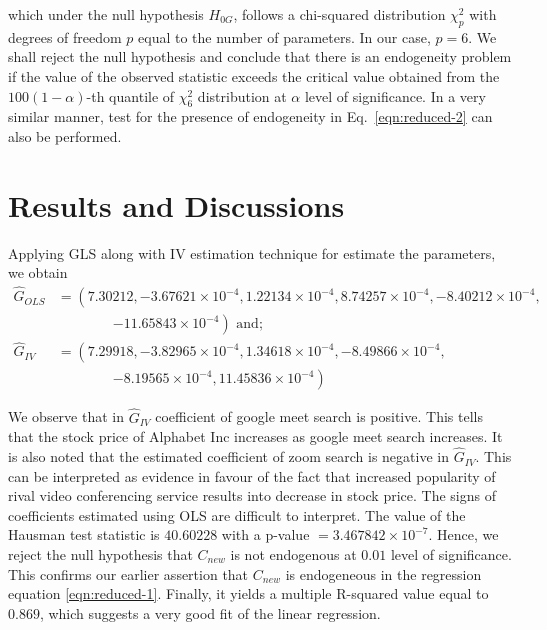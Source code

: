 \documentclass[11pt, a4paper]{article}
\begin{document}
\noindent which under the null hypothesis $H_{0G}$, follows a chi-squared distribution $\chi_p^2$ with degrees of freedom $p$ equal to the number of parameters. In our case, $p = 6$. We shall reject the null hypothesis and conclude that there is an endogeneity problem if the value of the observed statistic exceeds the critical value obtained from the $100(1-\alpha)$-th quantile of $\chi_6^2$ distribution at $\alpha$ level of significance. In a very similar manner, test for the presence of endogeneity in Eq.~\eqref{eqn:reduced-2} can also be performed.

\section{Results and Discussions}

Applying GLS along with IV estimation technique for estimate the parameters, we obtain
\begin{align*}
    \widehat{G}_{OLS} & = \left(7.30212, -3.67621\times 10^{-4}, 1.22134\times 10^{-4}, 8.74257\times 10^{-4}, -8.40212\times 10^{-4},\right.\\
    & \qquad \qquad \left. -11.65843\times10^{-4} \right) \text{ and; }\\
    \widehat{G}_{IV} & = \left(7.29918, -3.82965\times 10^{-4}, 1.34618\times 10^{-4}, -8.49866\times 10^{-4},\right.\\
    & \qquad \qquad \left. -8.19565\times 10^{-4}, 11.45836\times 10^{-4}\right)
\end{align*}

\noindent We observe that in $\widehat{G}_{IV}$ coefficient of google meet search is positive. This tells that the stock price of Alphabet Inc increases as google meet search increases. It is also noted that the estimated coefficient of zoom search is negative in $\widehat{G}_{IV}$. This can be interpreted as evidence in favour of the fact that increased popularity of rival video conferencing service results into decrease in stock price. The signs of coefficients estimated using OLS are difficult to interpret. The value of the Hausman test statistic is $40.60228$ with a p-value $=3.467842\times 10^{-7}$. Hence, we reject the null hypothesis that $C_{new}$ is not endogenous at $0.01$ level of significance. This confirms our earlier assertion that $C_{new}$ is endogeneous in the regression equation \eqref{eqn:reduced-1}. Finally, it yields a multiple R-squared value equal to $0.869$, which suggests a very good fit of the linear regression. 
\end{document}
